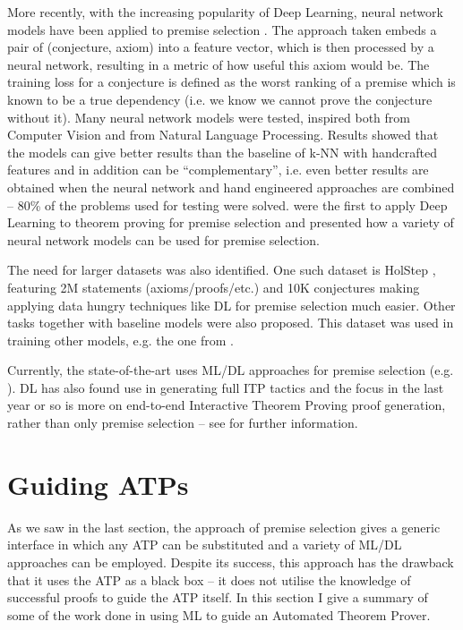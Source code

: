 \documentclass{article}
\begin{document}
More recently, with the increasing popularity of Deep Learning, neural network
models have been applied to premise selection \citep{DeepMath}. The approach
taken embeds a pair of (conjecture, axiom) into a feature vector, which is then
processed by a neural network, resulting in a metric of how useful this axiom
would be. The training loss for a conjecture is defined as the worst ranking of
a premise which is known to be a true dependency (i.e. we know we cannot prove
the conjecture without it). Many neural network models were tested, inspired
both from Computer Vision and from Natural Language Processing. Results showed
that the models can give better results than the baseline of k-NN with
handcrafted features and in addition can be ``complementary'', i.e. even better
results are obtained when the neural network and hand engineered approaches are
combined -- 80\% of the problems used for testing were solved. \cite{DeepMath}
were the first to apply Deep Learning to theorem proving for premise selection
and presented how a variety of neural network models can be used for premise
selection.

The need for larger datasets was also identified. One such dataset is HolStep
\citep{HolStep}, featuring 2M statements (axioms/proofs/etc.) and 10K
conjectures making applying data hungry techniques like DL for premise
selection much easier. Other tasks together with baseline models \citep[\S 3,
4]{HolStep} were also proposed. This dataset was used in training other models,
e.g. the one from \cite{DeepGraph}.


Currently, the state-of-the-art uses ML/DL approaches for premise selection
(e.g. \cite{DeepGraph}). DL has also found use in generating full ITP
tactics and the focus in the last year or so is more on end-to-end Interactive
Theorem Proving proof generation, rather than only premise selection -- see
\cite{LearningToProveITP, GamePad, GNNsForTP} for further information.

\section{Guiding ATPs}\label{sec:ATP}

As we saw in the last section, the approach of premise selection gives
a generic interface in which any ATP can be substituted and a variety of ML/DL
approaches can be employed. Despite its success, this approach has the drawback
that it uses the ATP as a black box -- it does not utilise the knowledge of
successful proofs to guide the ATP itself. In this section I give a summary of
some of the work done in using ML to guide an Automated Theorem Prover.
\end{document}
